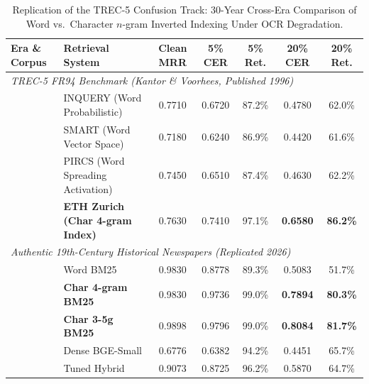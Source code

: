\begin{table}[t]
\centering
\caption{Replication of the TREC-5 Confusion Track: 30-Year Cross-Era Comparison of Word vs.\ Character $n$-gram Inverted Indexing Under OCR Degradation.}
\label{tab:trec5_replication}
\small
\begin{tabular}{llccccc}
\toprule
\textbf{Era \& Corpus} & \textbf{Retrieval System} & \textbf{Clean MRR} & \textbf{5\% CER} & \textbf{5\% Ret.} & \textbf{20\% CER} & \textbf{20\% Ret.} \\
\midrule
\multicolumn{7}{l}{\textit{TREC-5 FR94 Benchmark (Kantor \& Voorhees, Published 1996)}} \\
& INQUERY (Word Probabilistic) & 0.7710 & 0.6720 & 87.2\% & 0.4780 & 62.0\% \\
& SMART (Word Vector Space) & 0.7180 & 0.6240 & 86.9\% & 0.4420 & 61.6\% \\
& PIRCS (Word Spreading Activation) & 0.7450 & 0.6510 & 87.4\% & 0.4630 & 62.2\% \\
& \textbf{ETH Zurich (Char 4-gram Index)} & 0.7630 & 0.7410 & 97.1\% & \textbf{0.6580} & \textbf{86.2\%} \\
\midrule
\multicolumn{7}{l}{\textit{Authentic 19th-Century Historical Newspapers (Replicated 2026)}} \\
& Word BM25 & 0.9830 & 0.8778 & 89.3\% & 0.5083 & 51.7\% \\
& \textbf{Char 4-gram BM25} & 0.9830 & 0.9736 & 99.0\% & \textbf{0.7894} & \textbf{80.3\%} \\
& \textbf{Char 3-5g BM25} & 0.9898 & 0.9796 & 99.0\% & \textbf{0.8084} & \textbf{81.7\%} \\
& Dense BGE-Small & 0.6776 & 0.6382 & 94.2\% & 0.4451 & 65.7\% \\
& Tuned Hybrid & 0.9073 & 0.8725 & 96.2\% & 0.5870 & 64.7\% \\
\bottomrule
\end{tabular}
\end{table}

